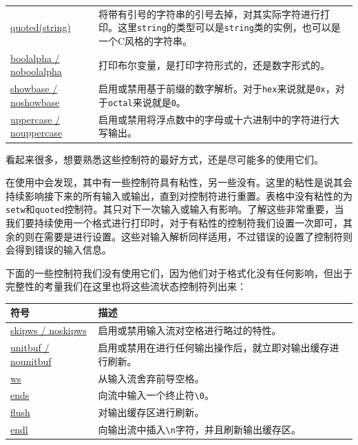 \begin{table}[htbp]
\begin{tabularx}{\textwidth}{XX}
\href{http://zh.cppreference.com/w/cpp/io/manip/quoted}{quoted(string)} & 将带有引号的字符串的引号去掉，对其实际字符进行打印。这里\texttt{string}的类型可以是\texttt{string}类的实例，也可以是一个C风格的字符串。 \\
\href{http://zh.cppreference.com/w/cpp/io/manip/boolalpha}{boolalpha / noboolalpha} & 打印布尔变量，是打印字符形式的，还是数字形式的。 \\
\href{http://zh.cppreference.com/w/cpp/io/manip/showbase}{showbase / noshowbase} & 启用或禁用基于前缀的数字解析。对于\texttt{hex}来说就是\texttt{0x}，对于\texttt{octal}来说就是\texttt{0}。 \\
\href{http://zh.cppreference.com/w/cpp/io/manip/uppercase}{uppercase / nouppercase} & 启用或禁用将浮点数中的字母或十六进制中的字符进行大写输出。 \\
\bottomrule
\end{tabularx}
\end{table}

看起来很多，想要熟悉这些控制符的最好方式，还是尽可能多的使用它们。

在使用中会发现，其中有一些控制符具有粘性，另一些没有。这里的粘性是说其会持续影响接下来的所有输入或输出，直到对控制符进行重置。表格中没有粘性的为\texttt{setw}和\texttt{quoted}控制符。其只对下一次输入或输入有影响。了解这些非常重要，当我们要持续使用一个格式进行打印时，对于有粘性的控制符我们设置一次即可，其余的则在需要是进行设置。这些对输入解析同样适用，不过错误的设置了控制符则会得到错误的输入信息。

下面的一些控制符我们没有使用它们，因为他们对于格式化没有任何影响，但出于完整性的考量我们在这里也将这些流状态控制符列出来：

\begin{table}[htbp]\centering
\begin{tabularx}{\textwidth}{lX}
\toprule
符号 & 描述 \\
\midrule
\href{http://zh.cppreference.com/w/cpp/io/manip/skipws}{skipws / noskipws} & 启用或禁用输入流对空格进行略过的特性。 \\
\href{http://zh.cppreference.com/w/cpp/io/manip/unitbuf}{unitbuf / nounitbuf} & 启用或禁用在进行任何输出操作后，就立即对输出缓存进行刷新。 \\
\href{http://zh.cppreference.com/w/cpp/io/manip/ws}{ws} & 从输入流舍弃前导空格。 \\
\href{http://zh.cppreference.com/w/cpp/io/manip/ends}{ends} & 向流中输入一个终止符\texttt{\textbackslash{}0}。 \\
\href{http://zh.cppreference.com/w/cpp/io/manip/flush}{flush} & 对输出缓存区进行刷新。 \\
\href{http://zh.cppreference.com/w/cpp/io/manip/endl}{endl} & 向输出流中插入\texttt{\textbackslash{}n}字符，并且刷新输出缓存区。 \\
\bottomrule
\end{tabularx}
\end{table}

